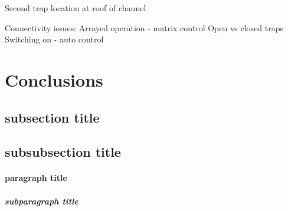Second trap location at roof of channel

Connectivity issues: Arrayed operation - matrix control
Open vs closed traps Switching on - auto control

\section{Conclusions}

\subsection{subsection title}
\subsection{subsubsection title}
\paragraph{paragraph title}
\subparagraph{subparagraph title}

